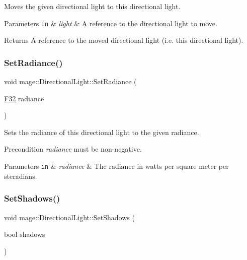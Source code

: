 Moves the given directional light to this directional light.


\begin{DoxyParams}[1]{Parameters}
\mbox{\tt in}  & {\em light} & A reference to the directional light to move. \\
\hline
\end{DoxyParams}
\begin{DoxyReturn}{Returns}
A reference to the moved directional light (i.\+e. this directional light). 
\end{DoxyReturn}
\hypertarget{classmage_1_1_directional_light_ac8b63948d393696ca8745c799328be84}{}\label{classmage_1_1_directional_light_ac8b63948d393696ca8745c799328be84} 
\subsubsection{\texorpdfstring{Set\+Radiance()}{SetRadiance()}}
{\footnotesize\ttfamily void mage\+::\+Directional\+Light\+::\+Set\+Radiance (\begin{DoxyParamCaption}\item[{\hyperlink{namespacemage_aa97e833b45f06d60a0a9c4fc22ae02c0}{F32}}]{radiance }\end{DoxyParamCaption})\hspace{0.3cm}{\ttfamily [noexcept]}}

Sets the radiance of this directional light to the given radiance.

\begin{DoxyPrecond}{Precondition}
{\itshape radiance} must be non-\/negative. 
\end{DoxyPrecond}

\begin{DoxyParams}[1]{Parameters}
\mbox{\tt in}  & {\em radiance} & The radiance in watts per square meter per steradians. \\
\hline
\end{DoxyParams}
\hypertarget{classmage_1_1_directional_light_ab70b4298dc6616dbe22446e8e3298424}{}\label{classmage_1_1_directional_light_ab70b4298dc6616dbe22446e8e3298424} 
\subsubsection{\texorpdfstring{Set\+Shadows()}{SetShadows()}}
{\footnotesize\ttfamily void mage\+::\+Directional\+Light\+::\+Set\+Shadows (\begin{DoxyParamCaption}\item[{bool}]{shadows }\end{DoxyParamCaption})\hspace{0.3cm}{\ttfamily [noexcept]}}

